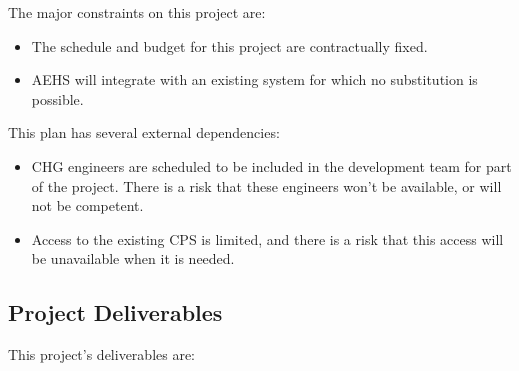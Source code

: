 \documentclass[11pt]{article}
\begin{document}
The major constraints on this project are:

\begin{itemize}
\item The schedule and budget for this project are contractually fixed.
\item AEHS will integrate with an existing system for which no substitution is possible.
\end{itemize}

This plan has several external dependencies:

\begin{itemize}
\item CHG engineers are scheduled to be included in the development team for part of the project.
  There is a risk that these engineers won't be available, or will not be competent.
\item Access to the existing CPS is limited, and there is a risk that this access will be
  unavailable when it is needed.
\end{itemize}

\subsection{Project Deliverables}
This project's deliverables are:
\end{document}
